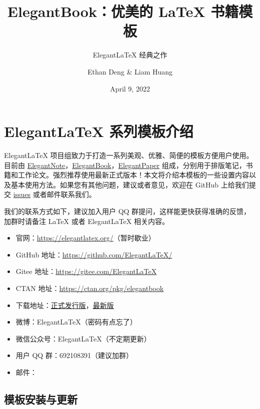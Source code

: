 \documentclass[lang=cn,10pt,cite=super]{elegantbook}
\title{ElegantBook：优美的 \LaTeX{} 书籍模板}
\subtitle{Elegant\LaTeX{} 经典之作}
\author{Ethan Deng \& Liam Huang}
\institute{Elegant\LaTeX{} Program}
\date{April 9, 2022}
\begin{document}
\maketitle
\frontmatter

\tableofcontents

\mainmatter

\chapter{Elegant\LaTeX{} 系列模板介绍}

Elegant\LaTeX{} 项目组致力于打造一系列美观、优雅、简便的模板方便用户使用。目前由 \href{https://github.com/ElegantLaTeX/ElegantNote}{ElegantNote}，\href{https://github.com/ElegantLaTeX/ElegantBook}{ElegantBook}，\href{https://github.com/ElegantLaTeX/ElegantPaper}{ElegantPaper} 组成，分别用于排版笔记，书籍和工作论文。强烈推荐使用最新正式版本！本文将介绍本模板的一些设置内容以及基本使用方法。如果您有其他问题，建议或者意见，欢迎在 GitHub 上给我们提交 \href{https://github.com/ElegantLaTeX/ElegantBook/issues}{issues} 或者邮件联系我们。

我们的联系方式如下，建议加入用户 QQ 群提问，这样能更快获得准确的反馈，加群时请备注 \LaTeX{} 或者 Elegant\LaTeX{} 相关内容。
\begin{itemize}
  \item 官网：\href{https://elegantlatex.org/}{https://elegantlatex.org/}（暂时歇业）
  \item GitHub 地址：\href{https://github.com/ElegantLaTeX/}{https://github.com/ElegantLaTeX/}
  \item Gitee 地址：\href{https://gitee.com/ElegantLaTeX}{https://gitee.com/ElegantLaTeX}
  \item CTAN 地址：\href{https://ctan.org/pkg/elegantbook}{https://ctan.org/pkg/elegantbook}
  \item 下载地址：\href{https://github.com/ElegantLaTeX/ElegantBook/releases}{正式发行版}，\href{https://github.com/ElegantLaTeX/ElegantBook/archive/master.zip}{最新版}
  \item 微博：Elegant\LaTeX{}（密码有点忘了）
  \item 微信公众号：Elegant\LaTeX{}（不定期更新）
  \item 用户 QQ 群：692108391（建议加群）
  \item 邮件：
\end{itemize}

\section{模板安装与更新}
\end{document}
